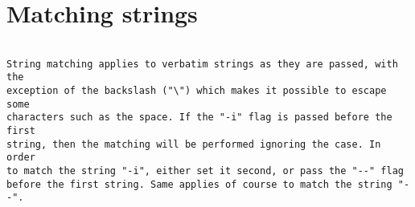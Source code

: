 
\section{Matching strings}

\begin{verbatim}

String matching applies to verbatim strings as they are passed, with the
exception of the backslash ("\") which makes it possible to escape some
characters such as the space. If the "-i" flag is passed before the first
string, then the matching will be performed ignoring the case. In order
to match the string "-i", either set it second, or pass the "--" flag
before the first string. Same applies of course to match the string "--".


\end{verbatim}
